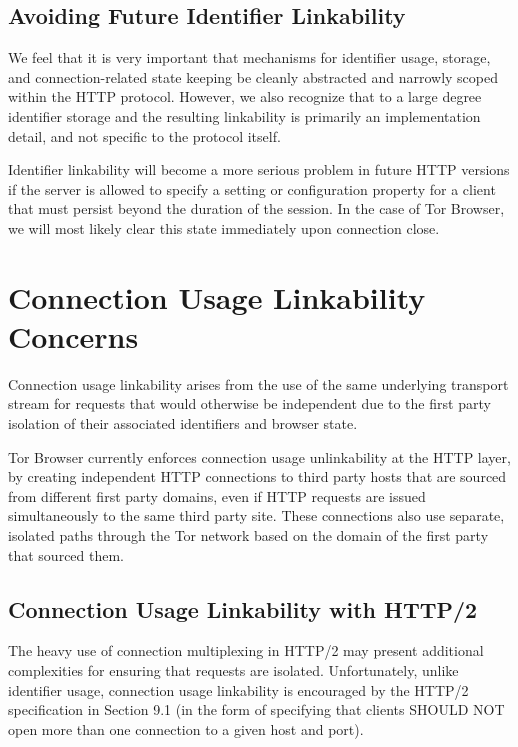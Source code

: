 \documentclass[letterpaper,11pt]{llncs}
\begin{document}
\subsection{Avoiding Future Identifier Linkability}

We feel that it is very important that mechanisms for identifier usage,
storage, and connection-related state keeping be cleanly abstracted and
narrowly scoped within the HTTP protocol. However, we also recognize that to a
large degree identifier storage and the resulting linkability is primarily an
implementation detail, and not specific to the protocol itself.

Identifier linkability will become a more serious problem in future HTTP
versions if the server is allowed to specify a setting or configuration
property for a client that must persist beyond the duration of the session.
In the case of Tor Browser, we will most likely clear this state immediately
upon connection close.

\section{Connection Usage Linkability Concerns}

Connection usage linkability arises from the use of the same underlying
transport stream for requests that would otherwise be independent due to the
first party isolation of their associated identifiers and browser state.

Tor Browser currently enforces connection usage unlinkability at the HTTP
layer, by creating independent HTTP connections to third party hosts that are
sourced from different first party domains, even if HTTP requests are issued
simultaneously to the same third party site. These connections also use
separate, isolated paths through the Tor network based on the domain of the
first party that sourced them.

\subsection{Connection Usage Linkability with HTTP/2}

The heavy use of connection multiplexing in HTTP/2 may present additional
complexities for ensuring that requests are isolated. Unfortunately, unlike
identifier usage, connection usage linkability is encouraged by the
HTTP/2 specification in Section 9.1 (in the form of specifying that clients
SHOULD NOT open more than one connection to a given host and
port)\cite{http2-spec}.
\end{document}
